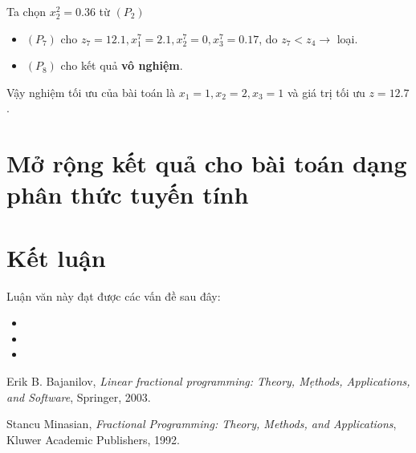 \documentclass[12pt,a4paper]{report}
\begin{document}
    
    
      Ta chọn $x^2_2=0.36$ từ $(P_2)$
      \begin{itemize}
        \item $(P_7)$ cho $z_7=12.1, x^7_1=2.1, x^7_2=0, x^7_3=0.17$, do $z_7<z_4 \rightarrow$ loại.
        \item $(P_8)$ cho kết quả \textbf{vô nghiệm}.
      \end{itemize} 
    Vậy nghiệm tối ưu của bài toán là $x_1=1, x_2=2, x_3=1$ và giá trị tối ưu $z=12.7$.
        

\chapter{Mở rộng kết quả cho bài toán dạng phân thức tuyến tính}


\chapter*{Kết luận}                         %
\indent
\thispagestyle{fancy}

Luận văn này đạt được các vấn đề sau đây:

\begin{itemize}
	\item 
	\item 
	\item
\end{itemize}



\begin{thebibliography}{99}
	\thispagestyle{fancy}
	
	
	
	
	 Erik B. Bajanilov, {\it Linear fractional programming: Theory, Mẹthods, Applications, and Software}, Springer, 2003.
		
	 Stancu Minasian, {\it Fractional Programming: Theory, Methods, and Applications}, Kluwer Academic Publishers, 1992.
	

	
	
\end{thebibliography}
\end{document}
